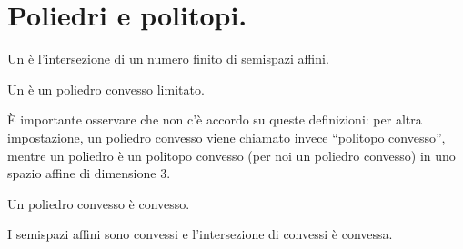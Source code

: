 \section{Poliedri e politopi.}\label{PoliedriEPolitopi}
\begin{Definition}
	Un  \`e l'intersezione di un numero finito di semispazi affini.
\end{Definition}
\begin{Definition}
	Un  \`e un poliedro convesso limitato.
\end{Definition}
\par \`E importante osservare che non c'\`e accordo su queste definizioni: per altra impostazione, un poliedro convesso viene chiamato invece ``politopo convesso'', mentre un poliedro \`e un politopo convesso (per noi un poliedro convesso) in uno spazio affine di dimensione $3$.
\begin{Theorem}
	Un poliedro convesso \`e convesso.
\end{Theorem}
\Proof I semispazi affini sono convessi e l'intersezione di convessi \`e convessa. \EndProof
